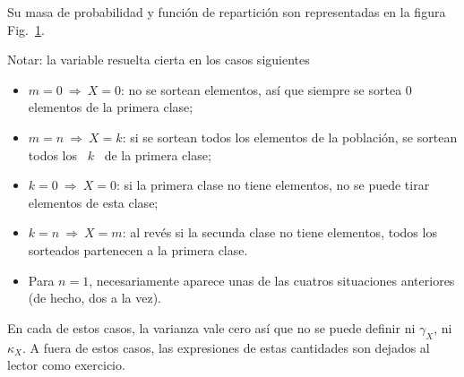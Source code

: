 Su masa  de probabilidad  y funci\'on de  repartici\'on son representadas  en la
figura Fig.~\ref{Fig:MP:Hipergeometrica}.
%
\begin{figure}[h!]
\begin{center}  \end{center}
%
\label{Fig:MP:Hipergeometrica}
\end{figure}


Notar: la variable resuelta cierta en los casos siguientes
%
\begin{itemize}
\item  $m = 0  \: \Rightarrow  \: X  = 0$:  no se  sortean elementos,  as\'i que
  siempre se sortea $0$ elementos de la primera clase;
%
\item $m =  n \: \Rightarrow \: X =  k$: si se sortean todos los  elementos de la
  poblaci\'on, se sortean todos los \ $k$ \ de la primera clase;
%
\item $k = 0 \: \Rightarrow \: X = 0$: si la primera clase no tiene elementos, no
  se puede tirar elementos de esta clase;
%
\item $k = n  \: \Rightarrow \: X = m$: al rev\'es si  la secunda clase no tiene
  elementos, todos los sorteados partenecen a la primera clase.
%
\item  Para $n  = 1$,  necesariamente aparece  unas de  las  cuatros situaciones
  anteriores (de hecho, dos a la vez).
\end{itemize}
%
En cada de estos  casos, la varianza vale cero as\'i que  no se puede definir ni
$\gamma_X$,  ni $\kappa_X$. A  fuera de  estos casos,  las expresiones  de estas
cantidades son dejados al lector como exercicio.

